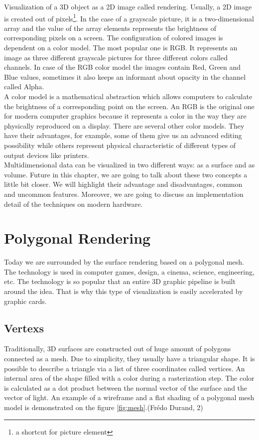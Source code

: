\documentclass[twoside, english, 11pt]{report}
\begin{document}
Visualization of a 3D object as a 2D image called rendering. Usually, a 2D image is created out of pixels\footnote{a shortcut for picture element}. In the case of a grayscale picture, it is a two-dimensional array and the value of the array elements represents the brightness of corresponding pixels on a screen. The configuration of colored images is dependent on a color model. The most popular one is RGB. It represents an image as three different grayscale pictures for three different colors called channels. In case of the RGB color model the images contain Red, Green and Blue values, sometimes it also keeps an informant about opacity in the channel called Alpha.\\

A color model is a mathematical abstraction which allows computers to calculate the brightness of a corresponding point on the screen. An RGB is the original one for modern computer graphics because it represents a color in the way they are physically reproduced on a display. There are several other color models. They have their advantages, for example, some of them give us an advanced editing possibility while others represent physical characteristic of different types of output devices like printers.\\

Multidimensional data can be visualized in two different ways: as a surface and as volume. Future in this chapter, we are going to talk about these two concepts a little bit closer. We will highlight their advantage and disadvantages, common and uncommon features. Moreover, we are going to discuss an implementation detail of the techniques on modern hardware.


\section{Polygonal Rendering}

Today we are surrounded by the surface rendering based on a polygonal mesh. The technology is used in computer games, design, a cinema, science, engineering, etc. The technology is so popular that an entire 3D graphic pipeline is built around the idea. That is why this type of visualization is easily accelerated by graphic cards.\\

\subsection{Vertexs}
Traditionally, 3D surfaces are constructed out of huge amount of polygons connected as a mesh. Due to simplicity, they usually have a triangular shape. It is possible to describe a triangle via a list of three coordinates called vertices. An internal area of the shape filled with a color during a rasterization step. The color is calculated as a dot product between the normal vector of the surface and the vector of light. An example of a wireframe and a flat shading of a polygonal mesh model is demonstrated on the figure \ref{fig:mesh}.(Frédo Durand, 2)
\end{document}
